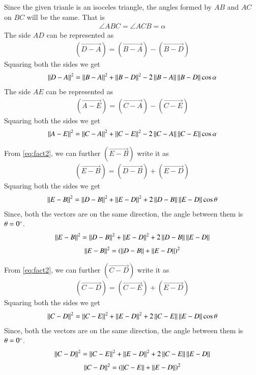 \documentclass[journal,12pt,twocolumn]{IEEEtran}
\begin{document}
	Since the given trianle is an isoceles triangle, the angles formed by $AB$ and $AC$ on $BC$ will be the same. That is
	\begin{align}\label{eq:fact3}
		\angle ABC = \angle ACB = \alpha
	\end{align}
	The side $AD$ can be represented as 
	\begin{align}\label{eq:eq1}
		(\vec{D-A}) = (\vec{B-A}) - (\vec{B-D})
	\end{align}
	Squaring both the sides we get	
	\begin{align} \label{eq:eq2}
		\left\lVert D-A\right\rVert^{2} = \left\lVert B-A\right\rVert^{2} + \left\lVert B-D\right\rVert^{2} - 2\left\lVert B-A\right\rVert\left\lVert B-D\right\rVert\cos\alpha
	\end{align}
	The side $AE$ can be represented as 
	\begin{align}\label{eq:eq3}
		(\vec{A-E}) = (\vec{C-A}) - (\vec{C-E})
	\end{align}
	Squaring both the sides we get	
	\begin{align} \label{eq:eq4}
		\left\lVert A-E\right\rVert^{2} = \left\lVert C-A\right\rVert^{2} + \left\lVert C-E\right\rVert^{2} - 2\left\lVert C-A\right\rVert\left\lVert C-E\right\rVert\cos\alpha
	\end{align}
	
	From \eqref{eq:fact2}, we can further $(\vec{E-B})$ write it as 
	\begin{align}\label{eq:eq5}
		(\vec{E-B}) = (\vec{D-B}) + (\vec{E-D})
	\end{align}
	Squaring both the sides we get
	\begin{align} \label{eq:eq6}
		\left\lVert E-B\right\rVert^{2} = \left\lVert D-B\right\rVert^{2} + \left\lVert E-D\right\rVert^{2} + 2\left\lVert D-B\right\rVert\left\lVert E-D\right\rVert\cos\theta
	\end{align}
	Since, both the vectors are on the same direction, the angle between them is $\theta = 0\degree$.
	\begin{align} \label{eq:eq7}
		\left\lVert E-B\right\rVert^{2} = \left\lVert D-B\right\rVert^{2} + \left\lVert E-D\right\rVert^{2} + 2\left\lVert D-B\right\rVert\left\lVert E-D\right\rVert
	\end{align}
	\begin{align}\label{eq:eq8}
		\left\lVert E-B\right\rVert^{2} = \left(\left\lVert D-B\right\rVert + \left\lVert E-D\right\rVert\right)^{2}
	\end{align}

	From \eqref{eq:fact2}, we can further $(\vec{C-D})$ write it as
	\begin{align}\label{eq:eq9}
		(\vec{C-D}) = (\vec{C-E}) + (\vec{E-D})
	\end{align}
	Squaring both the sides we get
	\begin{align} \label{eq:eq10}
		\left\lVert C-D\right\rVert^{2} = \left\lVert C-E\right\rVert^{2} + \left\lVert E-D\right\rVert^{2} + 2\left\lVert C-E\right\rVert\left\lVert E-D\right\rVert\cos\theta
	\end{align}
	Since, both the vectors are on the same direction, the angle between them is $\theta = 0\degree$.
	\begin{align} \label{eq:eq11}
		\left\lVert C-D\right\rVert^{2} = \left\lVert C-E\right\rVert^{2} + \left\lVert E-D\right\rVert^{2} + 2\left\lVert C-E\right\rVert\left\lVert E-D\right\rVert
	\end{align}
	\begin{align}\label{eq:eq12}
		\left\lVert C-D\right\rVert^{2} = \left(\left\lVert C-E\right\rVert + \left\lVert E-D\right\rVert\right)^{2}
	\end{align}
\end{document}
